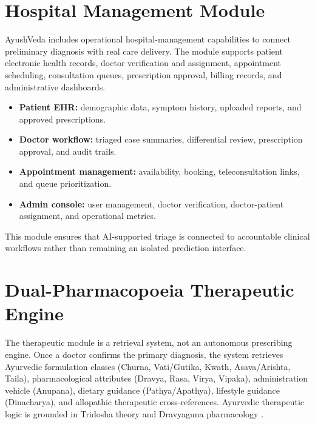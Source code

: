 \documentclass[conference]{IEEEtran}
\begin{document}
\section{Hospital Management Module}
AyushVeda includes operational hospital-management capabilities to connect preliminary diagnosis with real care delivery. The module supports patient electronic health records, doctor verification and assignment, appointment scheduling, consultation queues, prescription approval, billing records, and administrative dashboards.
\begin{itemize}
    \item \textbf{Patient EHR:} demographic data, symptom history, uploaded reports, and approved prescriptions.
    \item \textbf{Doctor workflow:} triaged case summaries, differential review, prescription approval, and audit trails.
    \item \textbf{Appointment management:} availability, booking, teleconsultation links, and queue prioritization.
    \item \textbf{Admin console:} user management, doctor verification, doctor-patient assignment, and operational metrics.
\end{itemize}
This module ensures that AI-supported triage is connected to accountable clinical workflows rather than remaining an isolated prediction interface.

\section{Dual-Pharmacopoeia Therapeutic Engine}
The therapeutic module is a retrieval system, not an autonomous prescribing engine. Once a doctor confirms the primary diagnosis, the system retrieves Ayurvedic formulation classes (Churna, Vati/Gutika, Kwath, Asava/Arishta, Taila), pharmacological attributes (Dravya, Rasa, Virya, Vipaka), administration vehicle (Anupana), dietary guidance (Pathya/Apathya), lifestyle guidance (Dinacharya), and allopathic therapeutic cross-references. Ayurvedic therapeutic logic is grounded in Tridosha theory and Dravyaguna pharmacology \cite{sharma2020ayurveda, patwardhan2015ayurveda}.
\end{document}

